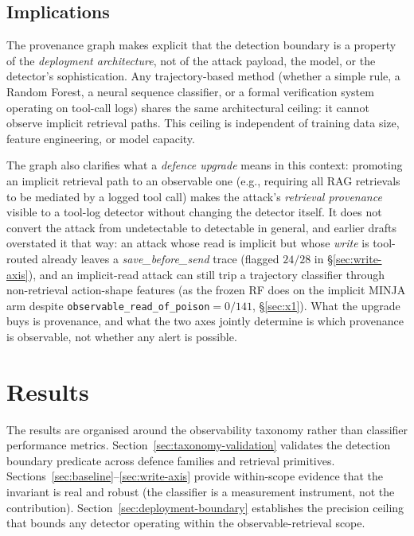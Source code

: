 \documentclass{article}
\begin{document}
\subsection{Implications}
\label{sec:graph-implications}

The provenance graph makes explicit that the detection boundary is a property of the \emph{deployment architecture}, not of the attack payload, the model, or the detector's sophistication. Any trajectory-based method (whether a simple rule, a Random Forest, a neural sequence classifier, or a formal verification system operating on tool-call logs) shares the same architectural ceiling: it cannot observe implicit retrieval paths. This ceiling is independent of training data size, feature engineering, or model capacity.

The graph also clarifies what a \emph{defence upgrade} means in this context: promoting an implicit retrieval path to an observable one (e.g., requiring all RAG retrievals to be mediated by a logged tool call) makes the attack's \emph{retrieval provenance} visible to a tool-log detector without changing the detector itself. It does not convert the attack from undetectable to detectable in general, and earlier drafts overstated it that way: an attack whose read is implicit but whose \emph{write} is tool-routed already leaves a \textit{save\_before\_send} trace (flagged $24/28$ in \S\ref{sec:write-axis}), and an implicit-read attack can still trip a trajectory classifier through non-retrieval action-shape features (as the frozen RF does on the implicit MINJA arm despite \texttt{observable\_read\_of\_poison}${=}0/141$, \S\ref{sec:x1}). What the upgrade buys is provenance, and what the two axes jointly determine is which provenance is observable, not whether any alert is possible.

\section{Results}
\label{sec:results}

The results are organised around the observability taxonomy rather than classifier performance metrics. Section~\ref{sec:taxonomy-validation} validates the detection boundary predicate across defence families and retrieval primitives. Sections~\ref{sec:baseline}--\ref{sec:write-axis} provide within-scope evidence that the invariant is real and robust (the classifier is a measurement instrument, not the contribution). Section~\ref{sec:deployment-boundary} establishes the precision ceiling that bounds any detector operating within the observable-retrieval scope.
\end{document}

